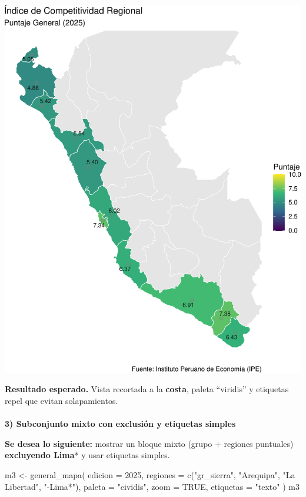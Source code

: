 \documentclass[
  11pt,
  letterpaper,
  DIV=11,
  numbers=noendperiod]{scrartcl}
\makeatletter
\let\oldparagraph\paragraph
\renewcommand{\paragraph}{
    \@ifstar
      \xxxParagraphStar
      \xxxParagraphNoStar
  }
\newcommand{\xxxParagraphStar}[1]{\oldparagraph*{#1}\mbox{}}
\newcommand{\xxxParagraphNoStar}[1]{\oldparagraph{#1}\mbox{}}
\newenvironment{Shaded}{\begin{snugshade}}{\end{snugshade}}
\newcommand{\AttributeTok}[1]{\textcolor[rgb]{0.40,0.45,0.13}{#1}}
\newcommand{\ConstantTok}[1]{\textcolor[rgb]{0.56,0.35,0.01}{#1}}
\newcommand{\DecValTok}[1]{\textcolor[rgb]{0.68,0.00,0.00}{#1}}
\newcommand{\FunctionTok}[1]{\textcolor[rgb]{0.28,0.35,0.67}{#1}}
\newcommand{\NormalTok}[1]{\textcolor[rgb]{0.00,0.23,0.31}{#1}}
\newcommand{\OtherTok}[1]{\textcolor[rgb]{0.00,0.23,0.31}{#1}}
\newcommand{\StringTok}[1]{\textcolor[rgb]{0.13,0.47,0.30}{#1}}
\makeatother
\begin{document}
\includegraphics{Manual_files/figure-pdf/unnamed-chunk-43-1.pdf}

\textbf{Resultado esperado.} Vista recortada a la \textbf{costa}, paleta
``viridis'' y etiquetas repel que evitan solapamientos.

\paragraph{\texorpdfstring{\textbf{3) Subconjunto mixto con exclusión y
etiquetas
simples}}{3) Subconjunto mixto con exclusión y etiquetas simples}}\label{subconjunto-mixto-con-exclusiuxf3n-y-etiquetas-simples}

\textbf{Se desea lo siguiente:} mostrar un bloque mixto (grupo +
regiones puntuales) \textbf{excluyendo Lima}* y usar etiquetas simples.

\begin{Shaded}
\begin{Highlighting}[]
\NormalTok{m3 }\OtherTok{\textless{}{-}} \FunctionTok{general\_mapa}\NormalTok{(}
  \AttributeTok{edicion   =} \DecValTok{2025}\NormalTok{,}
  \AttributeTok{regiones  =} \FunctionTok{c}\NormalTok{(}\StringTok{"gr\_sierra"}\NormalTok{, }\StringTok{"Arequipa"}\NormalTok{, }\StringTok{"La Libertad"}\NormalTok{, }\StringTok{"{-}Lima*"}\NormalTok{),}
  \AttributeTok{paleta    =} \StringTok{"cividis"}\NormalTok{,}
  \AttributeTok{zoom      =} \ConstantTok{TRUE}\NormalTok{,}
  \AttributeTok{etiquetas =} \StringTok{"texto"}
\NormalTok{)}
\NormalTok{m3}
\end{Highlighting}
\end{Shaded}
\end{document}
